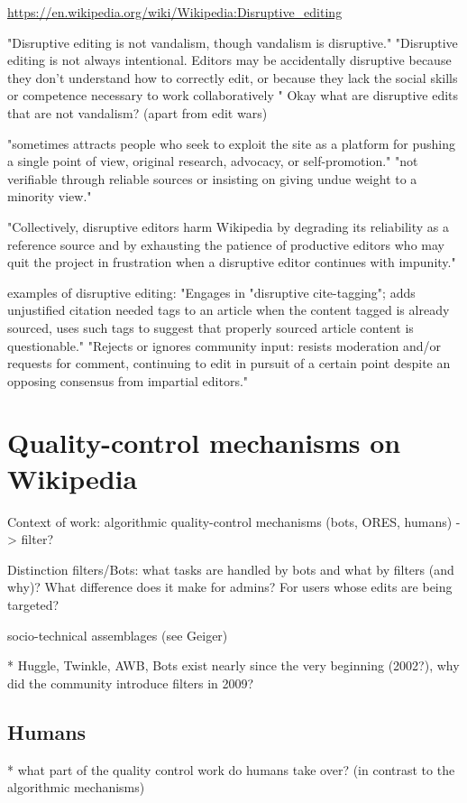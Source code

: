 \url{https://en.wikipedia.org/wiki/Wikipedia:Disruptive_editing}

"Disruptive editing is not vandalism, though vandalism is disruptive."
"Disruptive editing is not always intentional. Editors may be accidentally disruptive because they don't understand how to correctly edit, or because they lack the social skills or competence necessary to work collaboratively "
Okay what are disruptive edits that are not vandalism? (apart from edit wars)

"sometimes attracts people who seek to exploit the site as a platform for pushing a single point of view, original research, advocacy, or self-promotion."
"not verifiable through reliable sources or insisting on giving undue weight to a minority view."

"Collectively, disruptive editors harm Wikipedia by degrading its reliability as a reference source and by exhausting the patience of productive editors who may quit the project in frustration when a disruptive editor continues with impunity."

examples of disruptive editing:
"Engages in "disruptive cite-tagging"; adds unjustified {{citation needed}} tags to an article when the content tagged is already sourced, uses such tags to suggest that properly sourced article content is questionable."
"Rejects or ignores community input: resists moderation and/or requests for comment, continuing to edit in pursuit of a certain point despite an opposing consensus from impartial editors."


\section{Quality-control mechanisms on Wikipedia}
Context of work: algorithmic quality-control mechanisms (bots, ORES, humans) -> filter?

Distinction filters/Bots: what tasks are handled by bots and what by filters (and why)? What difference does it make for admins? For users whose edits are being targeted?

socio-technical assemblages (see Geiger)

* Huggle, Twinkle, AWB, Bots exist nearly since the very beginning (2002?), why did the community introduce filters in 2009?

\subsection{Humans}
* what part of the quality control work do humans take over? (in contrast to the algorithmic mechanisms)

